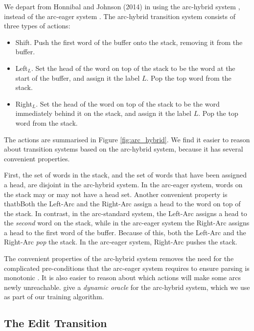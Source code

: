 \documentclass[11pt,letterpaper]{article}
\begin{document}
We depart from Honnibal and Johnson (2014) in using the arc-hybrid system \citep{kuhlmann:11},
instead of the arc-eager system \citep{nivre:03}.
The arc-hybrid transition system \citep{kuhlmann:11} consists of three types of actions:

\begin{itemize}
    \item Shift. Push the first word of the buffer onto the stack, removing it
          from the buffer.
      \item Left$_L$. Set the head of the word on top of the stack to be the
            word at the start of the buffer, and assign it the label $L$. Pop
            the top word from the stack.
      \item Right$_L$. Set the head of the word on top of the stack to be the
            word immediately behind it on the stack, and assign it the label $L$.
            Pop the top word from the stack.
\end{itemize}

The actions are summarised in Figure \ref{fig:arc_hybrid}.  We find it easier
to reason about transition systems based on the arc-hybrid system, because it has
several convenient properties.

First, the set of words in the stack, and the set
of words that have been assigned a head, are disjoint in the arc-hybrid
system.  In the arc-eager system, words on the stack may or may not
have a head set.
Another convenient property is thatbBoth the Left-Arc and the Right-Arc assign
a head to the word on top of the stack.  In contrast, in the arc-standard system,
the Left-Arc assigns a head to the \emph{second} word on the stack,
while in the arc-eager system the Right-Arc assigns a head to the
first word of the buffer.  Because of this,
both the Left-Arc and the Right-Arc
\emph{pop} the stack. In the arc-eager system, Right-Arc pushes the stack.

The convenient properties of the arc-hybrid system removes the need for the
complicated pre-conditions that the arc-eager system requires to ensure
parsing is monotonic \citep{honnibal:13}.  It is also easier to reason about
which actions will make some arcs newly unreachable.  \citet{goldberg:13}
give a \emph{dynamic oracle} for the arc-hybrid system, which we use as
part of our training algorithm.


\subsection{The Edit Transition}
\end{document}
